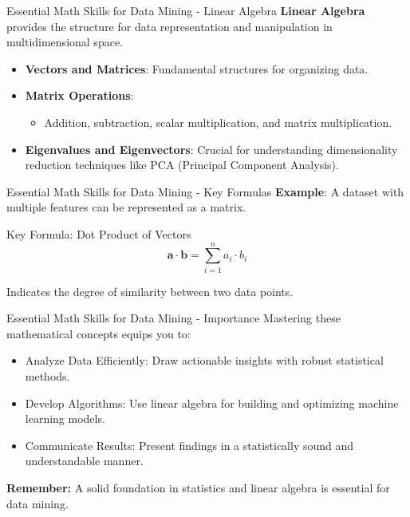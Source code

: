 \documentclass[aspectratio=169]{beamer}
\begin{document}
\begin{frame}[fragile]{Essential Math Skills for Data Mining - Linear Algebra}
    \textbf{Linear Algebra} provides the structure for data representation and manipulation in multidimensional space.

    \begin{itemize}
        \item \textbf{Vectors and Matrices}: Fundamental structures for organizing data.
        \item \textbf{Matrix Operations}:
            \begin{itemize}
                \item Addition, subtraction, scalar multiplication, and matrix multiplication.
            \end{itemize}
        \item \textbf{Eigenvalues and Eigenvectors}: Crucial for understanding dimensionality reduction techniques like PCA (Principal Component Analysis).
    \end{itemize}
\end{frame}

\begin{frame}[fragile]{Essential Math Skills for Data Mining - Key Formulas}
    \textbf{Example}: A dataset with multiple features can be represented as a matrix.

    \begin{block}{Key Formula: Dot Product of Vectors}
        \begin{equation}
            \mathbf{a} \cdot \mathbf{b} = \sum_{i=1}^{n} a_i \cdot b_i
        \end{equation}
    \end{block}

    Indicates the degree of similarity between two data points.
\end{frame}

\begin{frame}[fragile]{Essential Math Skills for Data Mining - Importance}
    Mastering these mathematical concepts equips you to:

    \begin{itemize}
        \item Analyze Data Efficiently: Draw actionable insights with robust statistical methods.
        \item Develop Algorithms: Use linear algebra for building and optimizing machine learning models.
        \item Communicate Results: Present findings in a statistically sound and understandable manner.
    \end{itemize}
    
    \textbf{Remember:} A solid foundation in statistics and linear algebra is essential for data mining.
\end{frame}
\end{document}

